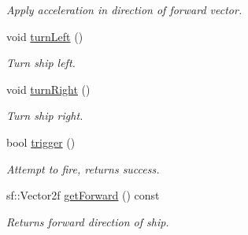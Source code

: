 \begin{DoxyCompactItemize}
\begin{DoxyCompactList}\small\item\em Apply acceleration in direction of forward vector. \end{DoxyCompactList}\item 
\hypertarget{class_ship_aee981dc9846a549b31274e7e2d29b82c}{}void \hyperlink{class_ship_aee981dc9846a549b31274e7e2d29b82c}{turn\+Left} ()\label{class_ship_aee981dc9846a549b31274e7e2d29b82c}

\begin{DoxyCompactList}\small\item\em Turn ship left. \end{DoxyCompactList}\item 
\hypertarget{class_ship_a471e4e86d3cf0ea0b02d3603575f070e}{}void \hyperlink{class_ship_a471e4e86d3cf0ea0b02d3603575f070e}{turn\+Right} ()\label{class_ship_a471e4e86d3cf0ea0b02d3603575f070e}

\begin{DoxyCompactList}\small\item\em Turn ship right. \end{DoxyCompactList}\item 
\hypertarget{class_ship_ad8f6d67f0ae2d0076792f9076a99373c}{}bool \hyperlink{class_ship_ad8f6d67f0ae2d0076792f9076a99373c}{trigger} ()\label{class_ship_ad8f6d67f0ae2d0076792f9076a99373c}

\begin{DoxyCompactList}\small\item\em Attempt to fire, returns success. \end{DoxyCompactList}\item 
\hypertarget{class_ship_a40f4d36fbef8f0b501f60b8ec817f8f6}{}sf\+::\+Vector2f \hyperlink{class_ship_a40f4d36fbef8f0b501f60b8ec817f8f6}{get\+Forward} () const \label{class_ship_a40f4d36fbef8f0b501f60b8ec817f8f6}

\begin{DoxyCompactList}\small\item\em Returns forward direction of ship. \end{DoxyCompactList}\end{DoxyCompactItemize}
